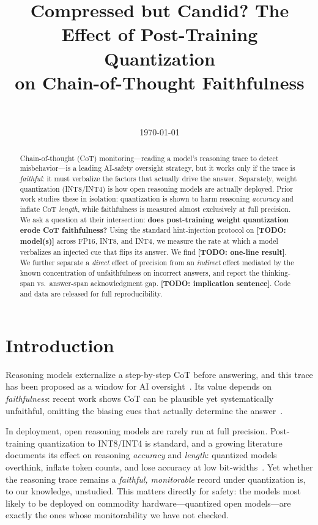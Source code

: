 \documentclass[11pt]{article}
\title{Compressed but Candid? The Effect of Post-Training Quantization\\
       on Chain-of-Thought Faithfulness}
\author{\todo{author} \\ \todo{affiliation}}
\date{\today}
\newcommand{\todo}[1]{{\color{red}\textbf{[TODO: #1]}}}
\begin{document}
\maketitle

\begin{abstract}
Chain-of-thought (CoT) monitoring---reading a model's reasoning trace to detect
misbehavior---is a leading AI-safety oversight strategy, but it works only if the
trace is \emph{faithful}: it must verbalize the factors that actually drive the
answer. Separately, weight quantization (INT8/INT4) is how open reasoning models
are actually deployed. Prior work studies these in isolation: quantization is
shown to harm reasoning \emph{accuracy} and inflate CoT \emph{length}, while
faithfulness is measured almost exclusively at full precision. We ask a question
at their intersection: \textbf{does post-training weight quantization erode CoT
faithfulness?} Using the standard hint-injection protocol on
\todo{model(s)} across FP16, INT8, and INT4, we measure the rate at which a
model verbalizes an injected cue that flips its answer. We find \todo{one-line
result}. We further separate a \emph{direct} effect of precision from an
\emph{indirect} effect mediated by the known concentration of unfaithfulness on
incorrect answers, and report the thinking-span vs.\ answer-span acknowledgment
gap. \todo{implication sentence}. Code and data are released for full
reproducibility.
\end{abstract}

\section{Introduction}
Reasoning models externalize a step-by-step CoT before answering, and this trace
has been proposed as a window for AI oversight~\cite{cotmonitorability2025,baker2025}.
Its value depends on \emph{faithfulness}: recent work shows CoT can be plausible
yet systematically unfaithful, omitting the biasing cues that actually determine
the answer~\cite{turpin2023,anthropic2025reasoning,lietome2026}.

In deployment, open reasoning models are rarely run at full precision. Post-training
quantization to INT8/INT4 is standard, and a growing literature documents its
effect on reasoning \emph{accuracy} and \emph{length}: quantized models overthink,
inflate token counts, and lose accuracy at low
bit-widths~\cite{quanthurts2025,overthinking2026,tokeninflation2026,multiplicative2026}.
Yet whether the reasoning trace remains a \emph{faithful, monitorable} record
under quantization is, to our knowledge, unstudied. This matters directly for
safety: the models most likely to be deployed on commodity hardware---quantized
open models---are exactly the ones whose monitorability we have not checked.
\end{document}
